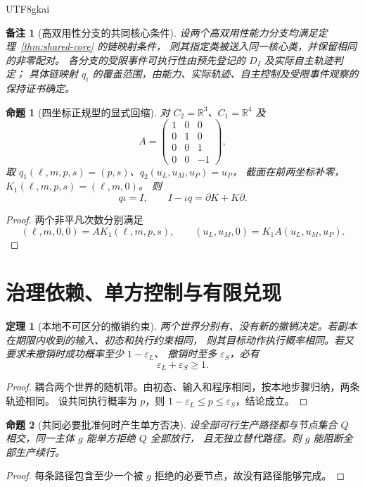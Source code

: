 \documentclass[12pt,a4paper,openany]{report}
\newtheorem{theorem}{定理}[chapter]
\newtheorem{proposition}{命题}[chapter]
\newtheorem{remark}{备注}[chapter]
\numberwithin{equation}{chapter}
\newcommand{\RR}{\mathbb R}
\begin{document}
\begin{CJK*}{UTF8}{gkai}
\begin{remark}[高双用性分支的共同核心条件]
设两个高双用性能力分支均满足定理~\ref{thm:shared-core} 的链映射条件，
则其指定类被送入同一核心类，并保留相同的非零配对。
各分支的受限事件可执行性由预先登记的 $D_I$ 及实际自主轨迹判定；
具体链映射 $q_i$ 的覆盖范围，由能力、实际轨迹、自主控制及受限事件观察的保持证书确定。
\end{remark}

\begin{proposition}[四坐标正规型的显式回缩]
对 $C_2=\RR^3$、$C_1=\RR^4$ 及
\[
 A=\begin{pmatrix}1&0&0\\0&1&0\\0&0&1\\0&0&-1\end{pmatrix},
\]
取 $q_1(\ell,m,p,s)=(p,s)$、$q_2(u_L,u_M,u_P)=u_P$，
截面在前两坐标补零，$K_1(\ell,m,p,s)=(\ell,m,0)$。
则
\[
 q\iota=I,\qquad I-\iota q=\partial K+K\partial.
\]
\end{proposition}
\begin{proof}
两个非平凡次数分别满足
\[
 (\ell,m,0,0)=AK_1(\ell,m,p,s),\qquad
 (u_L,u_M,0)=K_1A(u_L,u_M,u_P).
\]
\end{proof}

\section{治理依赖、单方控制与有限兑现}

\begin{theorem}[本地不可区分的撤销约束]
两个世界分别有、没有新的撤销决定。若副本在期限内收到的输入、初态和执行约束相同，
则其目标动作执行概率相同。若又要求未撤销时成功概率至少 $1-\varepsilon_L$、
撤销时至多 $\varepsilon_S$，必有
\[
 \varepsilon_L+\varepsilon_S\ge1.
\]
\end{theorem}
\begin{proof}
耦合两个世界的随机带。由初态、输入和程序相同，按本地步骤归纳，两条轨迹相同。
设共同执行概率为 $p$，则 $1-\varepsilon_L\le p\le\varepsilon_S$，结论成立。
\end{proof}

\begin{proposition}[共同必要批准何时产生单方否决]
设全部可行生产路径都与节点集合 $Q$ 相交，同一主体 $g$ 能单方拒绝 $Q$ 全部放行，
且无独立替代路径。则 $g$ 能阻断全部生产续行。
\end{proposition}
\begin{proof}
每条路径包含至少一个被 $g$ 拒绝的必要节点，故没有路径能够完成。
\end{proof}


\end{CJK*}
\end{document}
